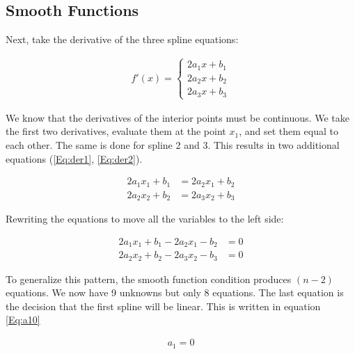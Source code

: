 \subsection{Smooth Functions}

Next, take the derivative of the three spline equations:

\begin{align}
	f'(x)=
\begin{cases}
	2a_1x+b_1\\ 
	2a_2x+b_2\\ 
	2a_3x+b_3 
\end{cases}
\end{align}

We know that the derivatives of the interior points must be continuous. We take the first two derivatives, evaluate them at the point $x_1$, and set them equal to each other. The same is done for spline 2 and 3. This results in two additional equations (\ref{Eq:der1}, \ref{Eq:der2}).

\begin{align}
	2a_1x_1+b_1 &= 2a_2x_1+b_2 \label{Eq:der1}\\
	2a_2x_2+b_2 &=2a_3x_2+b_3 \label{Eq:der2}
\end{align}

Rewriting the equations to move all the variables to the left side:

\begin{align}
	2a_1x_1+b_1 - 2a_2x_1-b_2 &=0\\
	2a_2x_2+b_2 - 2a_3x_2-b_3 &=0
\end{align}

To generalize this pattern, the smooth function condition produces $(n-2)$ equations. We now have 9 unknowns but only 8 equations. The last equation is the decision that the first spline will be linear. This is written in equation \ref{Eq:a10}

\begin{align}
	a_1=0
	\label{Eq:a10}
\end{align}

\renewcommand\arraystretch{1.3}


